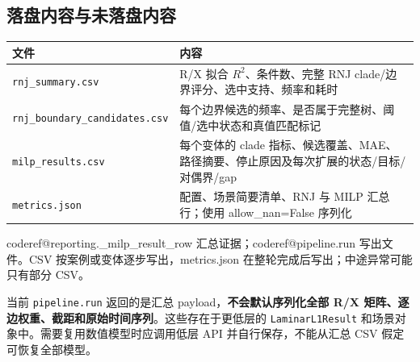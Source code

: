 \documentclass[UTF8,11pt,a4paper,fontset=windows]{ctexart}
\makeatletter
\newcommand{\CodeRef}[1]{\begingroup\small\csname coderef@#1\endcsname\endgroup}
\makeatother
\begin{document}
\subsection{落盘内容与未落盘内容}
\begin{longtable}{P{5.4cm}P{9.5cm}}\toprule
文件 & 内容\\\midrule\endhead
\nolinkurl{rnj_summary.csv} & R/X 拟合 $R^2$、条件数、完整 RNJ clade/边界评分、选中支持、频率和耗时\\
\nolinkurl{rnj_boundary_candidates.csv} & 每个边界候选的频率、是否属于完整树、阈值/选中状态和真值匹配标记\\
\nolinkurl{milp_results.csv} & 每个变体的 clade 指标、候选覆盖、MAE、路径摘要、停止原因及每次扩展的状态/目标/对偶界/gap\\
\nolinkurl{metrics.json} & 配置、场景简要清单、RNJ 与 MILP 汇总行；使用 allow\_nan=False 序列化\\
\bottomrule\end{longtable}
\CodeRef{reporting._milp_result_row} 汇总证据；\CodeRef{pipeline.run} 写出文件。CSV 按案例或变体逐步写出，metrics.json 在整轮完成后写出；中途异常可能只有部分 CSV。

当前 \nolinkurl{pipeline.run} 返回的是汇总 payload，\textbf{不会默认序列化全部 R/X 矩阵、逐边权重、截距和原始时间序列}。这些存在于更低层的 \nolinkurl{LaminarL1Result} 和场景对象中。需要复用数值模型时应调用低层 API 并自行保存，不能从汇总 CSV 假定可恢复全部模型。
\end{document}
